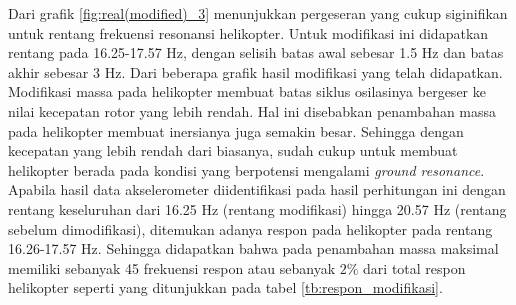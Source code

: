 \begin{table}[H]
	\centering
	\caption{Komparasi respon frekuensi pada rentang hasil modifikasi helikopter.}
	\label{tb:respon_modifikasi}
\end{table}

Dari grafik \ref{fig:real(modified)_3} menunjukkan pergeseran yang cukup siginifikan untuk rentang frekuensi resonansi helikopter. Untuk modifikasi ini didapatkan rentang pada 16.25-17.57 Hz, dengan selisih batas awal sebesar 1.5 Hz dan batas akhir sebesar 3 Hz. Dari beberapa grafik hasil modifikasi yang telah didapatkan. Modifikasi massa pada helikopter membuat batas siklus osilasinya bergeser ke nilai kecepatan rotor yang lebih rendah. Hal ini disebabkan penambahan massa pada helikopter membuat inersianya juga semakin besar. Sehingga dengan kecepatan yang lebih rendah dari biasanya, sudah cukup untuk membuat helikopter berada pada kondisi yang berpotensi mengalami \textit{ground resonance}. Apabila hasil data akselerometer diidentifikasi pada hasil perhitungan ini dengan rentang keseluruhan dari 16.25 Hz (rentang modifikasi) hingga 20.57 Hz (rentang sebelum dimodifikasi), ditemukan adanya respon pada helikopter pada rentang 16.26-17.57 Hz. Sehingga didapatkan bahwa pada penambahan massa maksimal memiliki sebanyak 45 frekuensi respon atau sebanyak $2\%$ dari total respon helikopter seperti yang ditunjukkan pada tabel \ref{tb:respon_modifikasi}.


